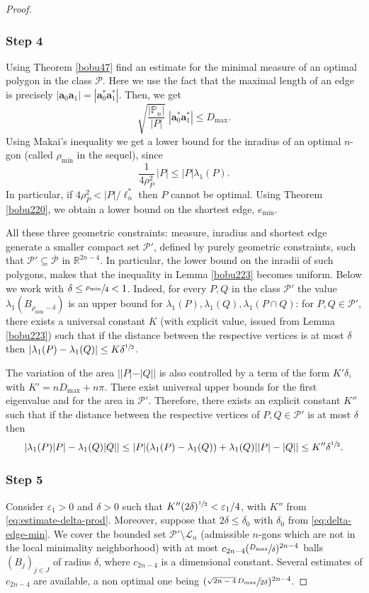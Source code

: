 \documentclass[11pt]{article}
\numberwithin{equation}{section}\newtheorem*{jepEnonce}{\jepEnonceTitle}\newenvironment{enonce*}[1]{\def\jepEnonceTitle{#1}\jepEnonce}{\endjepEnonce}\newtheorem*{conj*}{Conjecture}
\theoremstyle{plain}
\theoremstyle{definition}
\newcommand{\bo}[1]{{\boldsymbol#1}}
\let\Bbb\mathbb
\def\R{\mathbb{R}}
\newcommand{\lb}{\lambda}
\newcommand{\sq}{\subseteq}
\let\jepOriginalSfrac\sfrac
\renewcommand{\sfrac}[2]{{\jepOriginalSfrac{#1}{#2}}}
\begin{document}
\begin{proof}
\subsubsection*{Step 4} Using Theorem \ref{bobu47} find an estimate for the minimal measure of an optimal polygon in the class $\mathcal P$. Here we use the fact that the maximal length of an edge is precisely $| \bo a_0\bo a_1 | = |\bo a^*_0\bo a^*_1|$. Then, we get
\[
\sqrt{\frac{|\Bbb P_n|}{|P|}}\;
|\bo a_0^* \bo a_1^*|\le D_{\max}.
\]
Using Makai's inequality we get a lower bound for the inradius of an optimal $n$-gon (called $\rho_{\min}$ in the sequel), since
\[
\frac{1}{4\rho_P^2}\,|P|\le |P|\lb_1(P).
\]
In particular, {if $4\rho_P^2 < |P|/\ell_n^*$ then $P$ cannot be optimal.}
Using Theorem \ref{bobu220}, we obtain a lower bound on the shortest edge, $e_{\min}$.

All these three geometric constraints: measure, inradius and shortest edge generate a smaller compact set $\mathcal P' $, defined by purely geometric constraints, such that $\mathcal P' \sq \overline {\mathcal P}$ in $\R^{2n-4}$. In particular, the lower bound on the inradii of such polygons, makes that the inequality in Lemma \ref{bobu223} becomes uniform. Below we work with $\delta \le \sfrac{\rho_{\min}}{4}<1$. Indeed, for every $P, Q$ in the class $\mathcal P' $ the value $ \lb_1(B_{\rho_{\min}- \delta})$ is an upper bound for
$\lb_1(P), \lb_1(Q), \lb_1(P\cap Q)$: for $P,Q \in \mathcal P'$, there exists a universal constant $K$ (with explicit value, issued from Lemma \ref{bobu223}) such that if the distance between the respective vertices is at most $\delta$ then $|\lambda_1(P)-\lambda_1(Q)|\leq K\delta^{\sfrac 12}$.

The variation of the area $||P|-|Q||$ is also controlled by a term of the form $K'\delta $, with $K'= nD_{\max}+ n\pi$. There exist universal upper bounds for the first eigenvalue and for the area in $\mathcal P'$. Therefore, there exists an explicit constant $K''$ such that if the distance between the respective vertices of $P, Q\in \mathcal P'$ is at most $\delta$ then
\begin{equation}
|\lambda_1(P)|P|-\lambda_1(Q)|Q||\leq
|P|(\lambda_1(P)-\lambda_1(Q))+\lambda_1(Q)||P|-|Q|| \leq K''\delta^{\sfrac 12}.
\label{eq:estimate-delta-prod}
\end{equation}

\subsubsection*{Step 5}
Consider $\varepsilon_1>0$ and $\delta>0$ such that $K''(2\delta)^{\sfrac 12}<\varepsilon_1/4$, with $K''$ from \eqref{eq:estimate-delta-prod}. Moreover, suppose that $2\delta\leq \delta_0$ with $\delta_0$ from \eqref{eq:delta-edge-min}. We cover the bounded set $\mathcal P'\setminus \mathcal L_n$ (admissible $n$-gons which are not in the local minimality neighborhood) with at most $c_{2n-4}(\sfrac{D_{\max}}{\delta})^{2n-4}$ balls $(B_j)_{j \in J}$ of radius $\delta$, where $c_{2n-4}$ is a dimensional constant. Several estimates of $c_{2n-4}$ are available, a non optimal one being $(\sfrac{\sqrt{2n-4}\,D_{\max}}{2 \delta})^{2n-4}$.


\end{proof}
\end{document}
